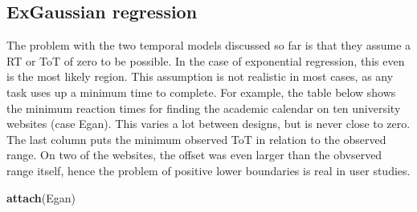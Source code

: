 \documentclass[]{svmono}
\newenvironment{Shaded}{\begin{snugshade}}{\end{snugshade}}
\newcommand{\KeywordTok}[1]{\textcolor[rgb]{0.13,0.29,0.53}{\textbf{#1}}}
\newcommand{\DataTypeTok}[1]{\textcolor[rgb]{0.13,0.29,0.53}{#1}}
\newcommand{\StringTok}[1]{\textcolor[rgb]{0.31,0.60,0.02}{#1}}
\newcommand{\OperatorTok}[1]{\textcolor[rgb]{0.81,0.36,0.00}{\textbf{#1}}}
\newcommand{\NormalTok}[1]{#1}
\theoremstyle{definition}
\theoremstyle{definition}
\theoremstyle{definition}
\theoremstyle{remark}
\begin{document}
\subsection{ExGaussian regression}\label{exgaussian-regression}

The problem with the two temporal models discussed so far is that they
assume a RT or ToT of zero to be possible. In the case of exponential
regression, this even is the most likely region. This assumption is not
realistic in most cases, as any task uses up a minimum time to complete.
For example, the table below shows the minimum reaction times for
finding the academic calendar on ten university websites (case Egan).
This varies a lot between designs, but is never close to zero. The last
column puts the minimum observed ToT in relation to the observed range.
On two of the websites, the offset was even larger than the obvserved
range itself, hence the problem of positive lower boundaries is real in
user studies.

\begin{Shaded}
\begin{Highlighting}[]
\KeywordTok{attach}\NormalTok{(Egan)}
\end{Highlighting}
\end{Shaded}

\begin{Shaded}
\end{Shaded}
\end{document}

